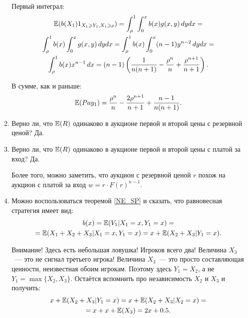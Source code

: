 \begin{enumerate}
Первый интеграл:
\begin{multline}
\operatorname{\mathbb{E}}(b(X_{1})1_{X_{1}\geqslant Y_{1},X_{1}\geqslant \rho})=\int_{\rho}^{1} \int_{0}^{x} b(x)g(x,y) \, dy dx =\\
\int_{\rho}^{1} b(x) \int_{0}^{x} g(x,y) \, dy dx =\int_{\rho}^{1} b(x) \int_{0}^{x} (n-1) y^{n-2} \, dy dx =\\
\int_{\rho}^{1}b(x) x^{n-1} \, dx =
(n-1)\left(\frac{1}{n(n+1)}-\frac{\rho^{n}}{n}+\frac{\rho^{n+1}}{n+1}\right).
\end{multline}

В сумме, как и раньше:
\begin{equation}
\operatorname{\mathbb{E}}(Pay_{1})=
\frac{\rho^{n}}{n}-\frac{2\rho^{n+1}}{n+1}+\frac{n-1}{n(n+1)}.
\end{equation}

\item  Верно ли, что $ \operatorname{\mathbb{E}}(R) $ одинаково в аукционе первой и второй цены с резервной ценой? Да.

\item  Верно ли, что $ \operatorname{\mathbb{E}}(R) $ одинаково в аукционе первой и второй цены с платой за вход? Да.

Более того, можно заметить, что аукцион с резервной ценой $ r $ похож на аукцион с платой за вход $ w=r\cdot F(r)^{n-1} $.

\item %
Можно воспользоваться теоремой \ref{NE_SP} и сказать, что равновесная стратегия имеет вид:
\begin{multline}
b(x)=\operatorname{\mathbb{E}}(V_{1}|X_{1}=x,Y_{1}=x)=\\
=\operatorname{\mathbb{E}}(X_{1}+X_{2}+X_{3}|X_{1}=x,Y_{1}=x)=x+\operatorname{\mathbb{E}}(X_{2}+X_{3}|Y_{1}=x).
\end{multline}

Внимание! Здесь есть небольшая ловушка! Игроков всего два! Величина $X_{3} $~— это не сигнал третьего игрока! Величина $ X_{3} $~— это просто составляющая ценности, неизвестная обоим игрокам. Поэтому здесь $ Y_{1}=X_{2} $, а не $ Y_{1}=\max\{X_{2},X_{3}\} $. Остаётся вспомнить про независимость $ X_{2} $ и $ X_{3} $ и получить:
\begin{multline}
x+\operatorname{\mathbb{E}}(X_{2}+X_{3}|Y_{1}=x)=x+\operatorname{\mathbb{E}}(X_{2}+X_{3}|X_{2}=x)=\\
=x+x+\operatorname{\mathbb{E}}(X_{3})=2x+0.5.
\end{multline}


\end{enumerate}
